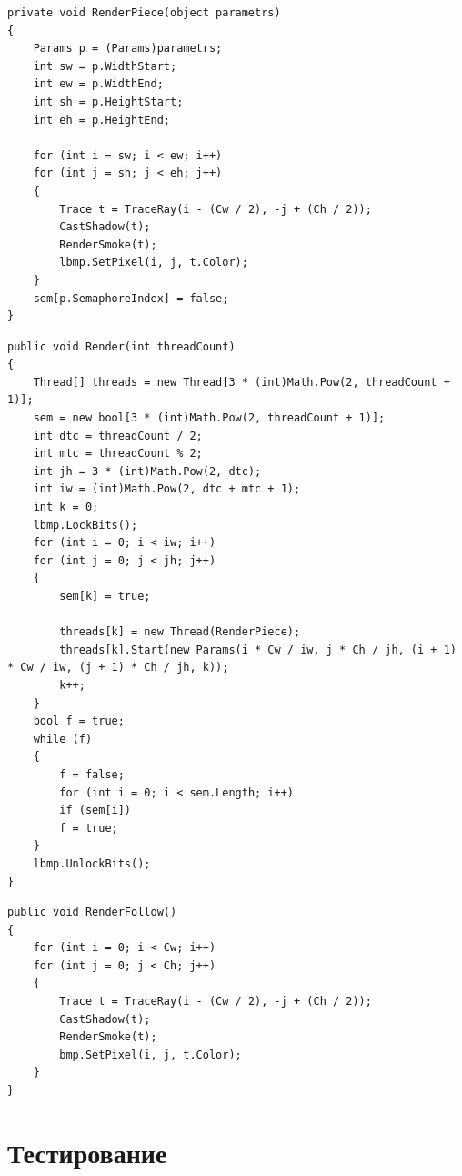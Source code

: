 \begin{lstlisting}[label=lst:work,caption=Метод рабочего потока]
private void RenderPiece(object parametrs)
{
	Params p = (Params)parametrs;
	int sw = p.WidthStart;
	int ew = p.WidthEnd;
	int sh = p.HeightStart;
	int eh = p.HeightEnd;

	for (int i = sw; i < ew; i++)
	for (int j = sh; j < eh; j++)
	{
		Trace t = TraceRay(i - (Cw / 2), -j + (Ch / 2));
		CastShadow(t);
		RenderSmoke(t);
		lbmp.SetPixel(i, j, t.Color);
	}
	sem[p.SemaphoreIndex] = false;
}
\end{lstlisting}

\begin{lstlisting}[label=lst:disp,caption=Метод потока диспетчера]
public void Render(int threadCount)
{
	Thread[] threads = new Thread[3 * (int)Math.Pow(2, threadCount + 1)];
	sem = new bool[3 * (int)Math.Pow(2, threadCount + 1)];
	int dtc = threadCount / 2;
	int mtc = threadCount % 2;
	int jh = 3 * (int)Math.Pow(2, dtc);
	int iw = (int)Math.Pow(2, dtc + mtc + 1);
	int k = 0;
	lbmp.LockBits();
	for (int i = 0; i < iw; i++)
	for (int j = 0; j < jh; j++)
	{
		sem[k] = true;
		
		threads[k] = new Thread(RenderPiece);
		threads[k].Start(new Params(i * Cw / iw, j * Ch / jh, (i + 1) * Cw / iw, (j + 1) * Ch / jh, k));
		k++;
	}
	bool f = true;
	while (f)
	{ 
		f = false;
		for (int i = 0; i < sem.Length; i++)
		if (sem[i])
		f = true;
	}
	lbmp.UnlockBits();
}
\end{lstlisting}

\begin{lstlisting}[label=lst:fllw,caption=Последовательный алгоритм обратной трассировки лучей]
public void RenderFollow()
{
	for (int i = 0; i < Cw; i++)
	for (int j = 0; j < Ch; j++)
	{
		Trace t = TraceRay(i - (Cw / 2), -j + (Ch / 2));
		CastShadow(t);
		RenderSmoke(t);
		bmp.SetPixel(i, j, t.Color);
	}
}
\end{lstlisting}

\section{Тестирование}

